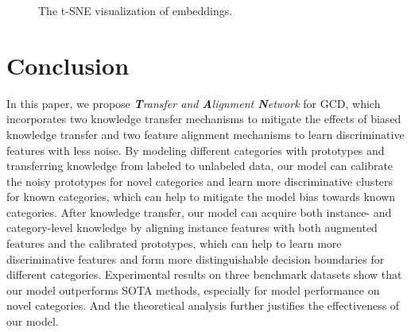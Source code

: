 \documentclass[letterpaper]{article} %
\begin{document}
\begin{figure}
\centering
{} \hspace{-10mm}
%
\centering
\caption{The t-SNE visualization of embeddings.}
\label{fig4}
\end{figure}











\section{Conclusion}
In this paper, we propose \textit{\textbf{T}ransfer and \textbf{A}lignment \textbf{N}etwork} for GCD, which incorporates two knowledge transfer mechanisms to mitigate the effects of biased knowledge transfer and two feature alignment mechanisms to learn discriminative features with less noise.
By modeling different categories with prototypes and transferring knowledge from labeled to unlabeled data, our model can calibrate the noisy prototypes for novel categories and learn more discriminative clusters for known categories, which can help to mitigate the model bias towards known categories.
After knowledge transfer, our model can acquire both instance- and category-level knowledge by aligning instance features with both augmented features and the calibrated prototypes, which can help to learn more discriminative features and form more distinguishable decision boundaries for different categories.
Experimental results on three benchmark datasets show that our model outperforms SOTA methods, especially for model performance on novel categories. And the theoretical analysis further justifies the effectiveness of our model. 
\end{document}
